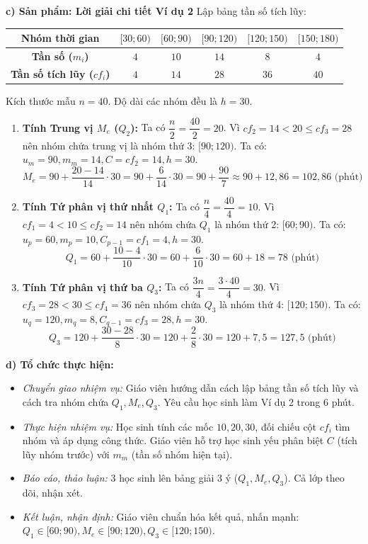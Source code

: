 \documentclass[12pt, a4paper]{article}
\begin{document}
\noindent \textbf{c) Sản phẩm: Lời giải chi tiết Ví dụ 2}
Lập bảng tần số tích lũy:
\begin{center}
\small
\begin{tabular}{|c|c|c|c|c|c|}
\hline
\textbf{Nhóm thời gian} & $[30; 60)$ & $[60; 90)$ & $[90; 120)$ & $[120; 150)$ & $[150; 180)$ \\ \hline
\textbf{Tần số ($m_i$)} & $4$ & $10$ & $14$ & $8$ & $4$ \\ \hline
\textbf{Tần số tích lũy ($cf_i$)} & $4$ & $14$ & $28$ & $36$ & $40$ \\ \hline
\end{tabular}
\end{center}
Kích thước mẫu $n = 40$. Độ dài các nhóm đều là $h = 30$.
\begin{enumerate}[leftmargin=0.6cm]
    \item \textbf{Tính Trung vị $M_e$ ($Q_2$):}
    Ta có $\dfrac{n}{2} = \dfrac{40}{2} = 20$.
    Vì $cf_2 = 14 < 20 \le cf_3 = 28$ nên nhóm chứa trung vị là nhóm thứ 3: $[90; 120)$.
    Ta có: $u_m = 90, m_m = 14, C = cf_2 = 14, h = 30$.
    $$M_e = 90 + \dfrac{20 - 14}{14} \cdot 30 = 90 + \dfrac{6}{14} \cdot 30 = 90 + \dfrac{90}{7} \approx 90 + 12{,}86 = 102{,}86\text{ (phút)}$$

    \item \textbf{Tính Tứ phân vị thứ nhất $Q_1$:}
    Ta có $\dfrac{n}{4} = \dfrac{40}{4} = 10$.
    Vì $cf_1 = 4 < 10 \le cf_2 = 14$ nên nhóm chứa $Q_1$ là nhóm thứ 2: $[60; 90)$.
    Ta có: $u_p = 60, m_p = 10, C_{p-1} = cf_1 = 4, h = 30$.
    $$Q_1 = 60 + \dfrac{10 - 4}{10} \cdot 30 = 60 + \dfrac{6}{10} \cdot 30 = 60 + 18 = 78\text{ (phút)}$$

    \item \textbf{Tính Tứ phân vị thứ ba $Q_3$:}
    Ta có $\dfrac{3n}{4} = \dfrac{3 \cdot 40}{4} = 30$.
    Vì $cf_3 = 28 < 30 \le cf_4 = 36$ nên nhóm chứa $Q_3$ là nhóm thứ 4: $[120; 150)$.
    Ta có: $u_q = 120, m_q = 8, C_{q-1} = cf_3 = 28, h = 30$.
    $$Q_3 = 120 + \dfrac{30 - 28}{8} \cdot 30 = 120 + \dfrac{2}{8} \cdot 30 = 120 + 7{,}5 = 127{,}5\text{ (phút)}$$
\end{enumerate}

\noindent \textbf{d) Tổ chức thực hiện:}
\begin{itemize}[leftmargin=0.8cm]
    \item \textit{Chuyển giao nhiệm vụ:} Giáo viên hướng dẫn cách lập bảng tần số tích lũy và cách tra nhóm chứa $Q_1, M_e, Q_3$. Yêu cầu học sinh làm Ví dụ 2 trong 6 phút.
    \item \textit{Thực hiện nhiệm vụ:} Học sinh tính các mốc $10, 20, 30$, đối chiếu cột $cf_i$ tìm nhóm và áp dụng công thức. Giáo viên hỗ trợ học sinh yếu phân biệt $C$ (tích lũy nhóm trước) với $m_m$ (tần số nhóm hiện tại).
    \item \textit{Báo cáo, thảo luận:} 3 học sinh lên bảng giải 3 ý ($Q_1, M_e, Q_3$). Cả lớp theo dõi, nhận xét.
    \item \textit{Kết luận, nhận định:} Giáo viên chuẩn hóa kết quả, nhấn mạnh: $Q_1 \in [60; 90), M_e \in [90; 120), Q_3 \in [120; 150)$.
\end{itemize}
\end{document}
